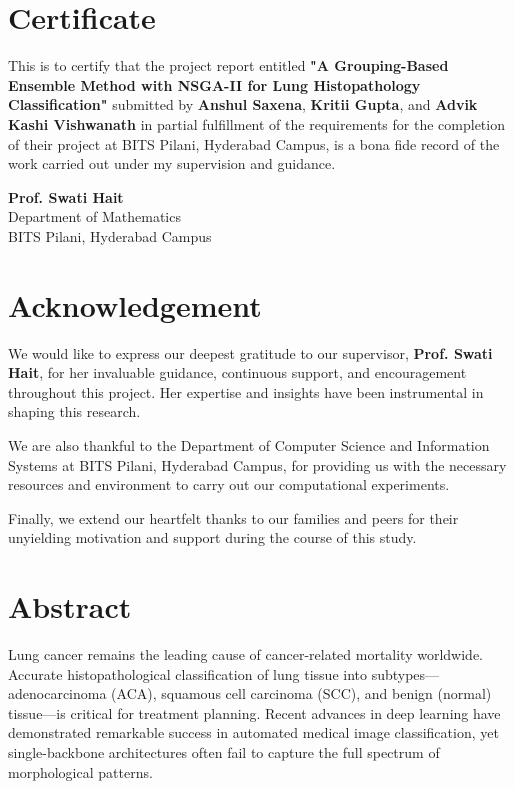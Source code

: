 \documentclass[11pt,a4paper]{article}
\begin{document}
\section*{Certificate}
This is to certify that the project report entitled \textbf{"A Grouping-Based Ensemble Method with NSGA-II for Lung Histopathology Classification"} submitted by \textbf{Anshul Saxena}, \textbf{Kritii Gupta}, and \textbf{Advik Kashi Vishwanath} in partial fulfillment of the requirements for the completion of their project at BITS Pilani, Hyderabad Campus, is a bona fide record of the work carried out under my supervision and guidance. 

\vspace{2cm}
\noindent\textbf{Prof. Swati Hait}\\
Department of Mathematics\\
BITS Pilani, Hyderabad Campus

\newpage

\section*{Acknowledgement}
We would like to express our deepest gratitude to our supervisor, \textbf{Prof. Swati Hait}, for her invaluable guidance, continuous support, and encouragement throughout this project. Her expertise and insights have been instrumental in shaping this research.

We are also thankful to the Department of Computer Science and Information Systems at BITS Pilani, Hyderabad Campus, for providing us with the necessary resources and environment to carry out our computational experiments. 

Finally, we extend our heartfelt thanks to our families and peers for their unyielding motivation and support during the course of this study.

\newpage

\section*{Abstract}
Lung cancer remains the leading cause of cancer-related mortality worldwide. Accurate histopathological classification of lung tissue into subtypes—adenocarcinoma (ACA), squamous cell carcinoma (SCC), and benign (normal) tissue—is critical for treatment planning. Recent advances in deep learning have demonstrated remarkable success in automated medical image classification, yet single-backbone architectures often fail to capture the full spectrum of morphological patterns.
\end{document}
